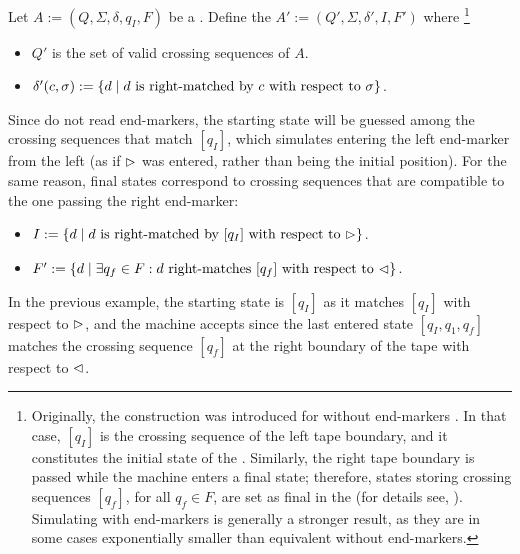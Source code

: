 Let $A:=(Q,\Sigma,\delta,q_I,F)$ be a \TDFA.
Define the \NFA $A':=(Q',\Sigma,\delta',I,F')$ where%
\footnote{ %
	Originally, the construction was introduced for \TDFAs without end-markers \cite{RabSco59}.
	In that case, $[q_I]$ is the crossing sequence of the left tape boundary, and it constitutes the initial state of the \NFA.
	Similarly, the right tape boundary is passed while the machine enters a final state; therefore, states storing crossing sequences $[q_f]$, for all $q_f\in F$, are set as final in the \NFA (for details see, \eg[,] \cite{HopUll79}).
	Simulating \TDFAs with end-markers is generally a stronger result, as they are in some cases exponentially smaller than equivalent \TDFAs without end-markers.
}
\begin{itemize}
	\item $Q'$ is the set of valid crossing sequences of $A$.
	\item $\delta'(c,\sigma):=\{d \mid \text{$d$ is right-matched by $c$ with respect to~$\sigma$}\}$.
\end{itemize}
Since \NFAs do not read end-markers, the starting state will be guessed among the crossing sequences that match $[q_I]$, which simulates entering the left end-marker from the left (as if $\rhd$ was entered, rather than being the initial position).
For the same reason, final states correspond to crossing sequences that are compatible to the one passing the right end-marker:
\begin{itemize}
	\item $I:=\{d\mid \text{$d$ is right-matched by $[q_I]$ with respect to $\rhd$}\}$.
	\item $F':=\{d\mid \exists q_f\in F: \text{$d$ right-matches $[q_f]$ with respect to $\lhd$}\}$.
\end{itemize}
In the previous example, the starting state is $[q_I]$ as it matches $[q_I]$ with respect to $\rhd$, and the machine accepts since the last entered state $[q_I,q_1,q_f]$ matches the crossing sequence $[q_f]$ at the right boundary of the tape with respect to $\lhd$.

